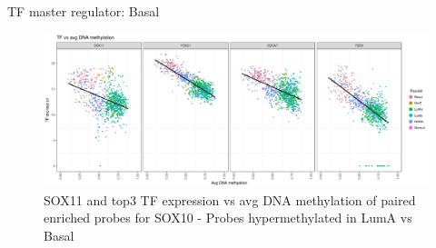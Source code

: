 \documentclass[slidestop,compress,11pt,xcolor=dvipsnames]{beamer}
\begin{document}






\begin{frame}{TF master regulator: Basal}

 \begin{figure}[ht!]
  \centering
  \includegraphics[width=1.0\textwidth]{ELMER/SOX10_TF.png}
  \caption{\label{fig:chiapet} SOX11 and top3 TF expression vs avg DNA methylation of paired enriched probes for SOX10 - Probes hypermethylated in LumA vs Basal}
 \end{figure}
\end{frame}
\end{document}
